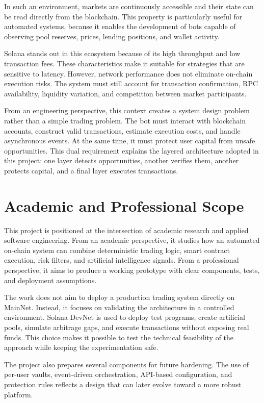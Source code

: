 \documentclass[12pt,a4paper]{report}
\begin{document}
In such an environment, markets are continuously accessible and their state can be read directly from the blockchain. This property is particularly useful for automated systems, because it enables the development of bots capable of observing pool reserves, prices, lending positions, and wallet activity.

Solana stands out in this ecosystem because of its high throughput and low transaction fees. These characteristics make it suitable for strategies that are sensitive to latency. However, network performance does not eliminate on-chain execution risks. The system must still account for transaction confirmation, RPC availability, liquidity variation, and competition between market participants.

From an engineering perspective, this context creates a system design problem rather than a simple trading problem. The bot must interact with blockchain accounts, construct valid transactions, estimate execution costs, and handle asynchronous events. At the same time, it must protect user capital from unsafe opportunities. This dual requirement explains the layered architecture adopted in this project: one layer detects opportunities, another verifies them, another protects capital, and a final layer executes transactions.

\section{Academic and Professional Scope}

This project is positioned at the intersection of academic research and applied software engineering. From an academic perspective, it studies how an automated on-chain system can combine deterministic trading logic, smart contract execution, risk filters, and artificial intelligence signals. From a professional perspective, it aims to produce a working prototype with clear components, tests, and deployment assumptions.

The work does not aim to deploy a production trading system directly on MainNet. Instead, it focuses on validating the architecture in a controlled environment. Solana DevNet is used to deploy test programs, create artificial pools, simulate arbitrage gaps, and execute transactions without exposing real funds. This choice makes it possible to test the technical feasibility of the approach while keeping the experimentation safe.

The project also prepares several components for future hardening. The use of per-user vaults, event-driven orchestration, API-based configuration, and protection rules reflects a design that can later evolve toward a more robust platform.
\end{document}
